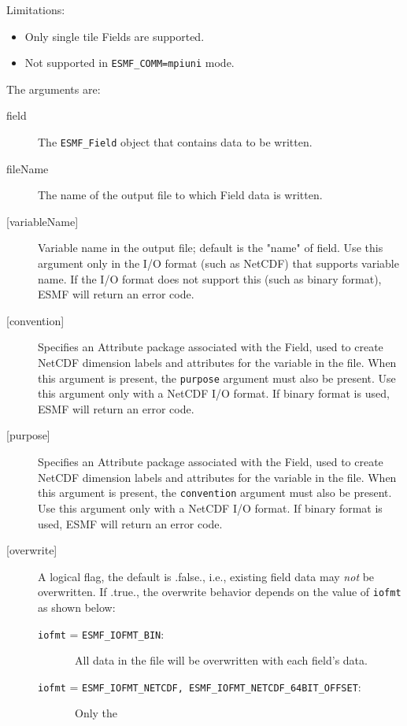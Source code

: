      Limitations:
     \begin{itemize}
       \item Only single tile Fields are supported.
       \item Not supported in {\tt ESMF\_COMM=mpiuni} mode.
     \end{itemize}
  
     The arguments are:
     \begin{description}
     \item [field]
       The {\tt ESMF\_Field} object that contains data to be written.
     \item[fileName]
       The name of the output file to which Field data is written.
     \item[{[variableName]}]
      Variable name in the output file; default is the "name" of field.
      Use this argument only in the I/O format (such as NetCDF) that
      supports variable name. If the I/O format does not support this
      (such as binary format), ESMF will return an error code.
     \item[{[convention]}]
       Specifies an Attribute package associated with the Field, used to create NetCDF
       dimension labels and attributes for the variable in the file.  When this argument is present,
       the {\tt purpose} argument must also be present.  Use this argument only with a NetCDF
       I/O format. If binary format is used, ESMF will return an error code.
     \item[{[purpose]}]
       Specifies an Attribute package associated with the Field, used to create NetCDF
       dimension labels and attributes for the variable in the file.  When this argument is present,
       the {\tt convention} argument must also be present.  Use this argument only with a NetCDF
       I/O format. If binary format is used, ESMF will return an error code.
     \item[{[overwrite]}]
      \begin{sloppypar}
        A logical flag, the default is .false., i.e., existing field data may
        {\em not} be overwritten. If .true., the overwrite behavior depends
        on the value of {\tt iofmt} as shown below:
      \begin{description}
      \item[{\tt iofmt} = {\tt ESMF\_IOFMT\_BIN}:]\ All data in the file will
        be overwritten with each field's data.
      \item[{\tt iofmt} = {\tt ESMF\_IOFMT\_NETCDF, ESMF\_IOFMT\_NETCDF\_64BIT\_OFFSET}:]\ Only the

\end{description}
\end{sloppypar}
\end{description}
